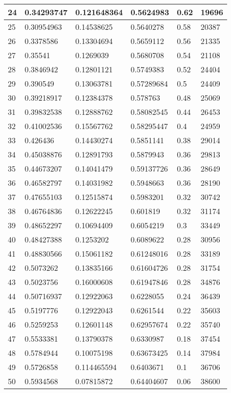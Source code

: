 \begin{longtable}{|l|l|l|l|l|l|}
24 & 0.34293747 & 0.121648364 & 0.5624983 & 0.62 & 19696 \\ \hline 
25 & 0.30954963 & 0.14538625 & 0.5640278 & 0.58 & 20387 \\ \hline 
26 & 0.3378586 & 0.13304694 & 0.5659112 & 0.56 & 21335 \\ \hline 
27 & 0.35541 & 0.1269039 & 0.5680708 & 0.54 & 21108 \\ \hline 
28 & 0.3846942 & 0.12801121 & 0.5749383 & 0.52 & 24404 \\ \hline 
29 & 0.390549 & 0.13063781 & 0.57289684 & 0.5 & 24409 \\ \hline 
30 & 0.39218917 & 0.12384378 & 0.578763 & 0.48 & 25069 \\ \hline 
31 & 0.39832538 & 0.12888762 & 0.58082545 & 0.44 & 26453 \\ \hline 
32 & 0.41002536 & 0.15567762 & 0.58295447 & 0.4 & 24959 \\ \hline 
33 & 0.426436 & 0.14430274 & 0.5851141 & 0.38 & 29014 \\ \hline 
34 & 0.45038876 & 0.12891793 & 0.5879943 & 0.36 & 29813 \\ \hline 
35 & 0.44673207 & 0.14041479 & 0.59137726 & 0.36 & 28649 \\ \hline 
36 & 0.46582797 & 0.14031982 & 0.5948663 & 0.36 & 28190 \\ \hline 
37 & 0.47655103 & 0.12515874 & 0.5983201 & 0.32 & 30742 \\ \hline 
38 & 0.46764836 & 0.12622245 & 0.601819 & 0.32 & 31174 \\ \hline 
39 & 0.48652297 & 0.10694409 & 0.6054219 & 0.3 & 33449 \\ \hline 
40 & 0.48427388 & 0.1253202 & 0.6089622 & 0.28 & 30956 \\ \hline 
41 & 0.48830566 & 0.15061182 & 0.61248016 & 0.28 & 33189 \\ \hline 
42 & 0.5073262 & 0.13835166 & 0.61604726 & 0.28 & 31754 \\ \hline 
43 & 0.5023756 & 0.16000608 & 0.61947846 & 0.28 & 34876 \\ \hline 
44 & 0.50716937 & 0.12922063 & 0.6228055 & 0.24 & 36439 \\ \hline 
45 & 0.5197776 & 0.12922043 & 0.6261544 & 0.22 & 35603 \\ \hline 
46 & 0.5259253 & 0.12601148 & 0.62957674 & 0.22 & 35740 \\ \hline 
47 & 0.5533381 & 0.13790378 & 0.6330987 & 0.18 & 37454 \\ \hline 
48 & 0.5784944 & 0.10075198 & 0.63673425 & 0.14 & 37984 \\ \hline 
49 & 0.5726858 & 0.114465594 & 0.6403671 & 0.1 & 36706 \\ \hline 
50 & 0.5934568 & 0.07815872 & 0.64404607 & 0.06 & 38600 \\ \hline 
\end{longtable}